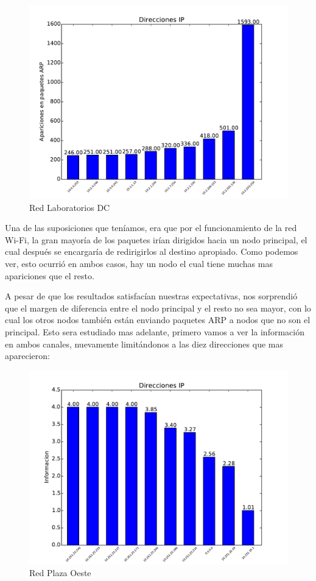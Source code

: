\begin{figure}[ht]
\begin{center}
\includegraphics[width=0.6\columnwidth]{graficos/dc_top_s2.pdf}
\caption{Red Laboratorios DC}
\end{center}
\end{figure}

\pagebreak

Una de las suposiciones que teníamos, era que por el funcionamiento de la red Wi-Fi, la gran mayoría de los paquetes irían dirigidos hacia un nodo principal, el cual después se encargaría de redirigirlos al destino apropiado. Como podemos ver, esto ocurrió en ambos casos, hay un nodo el cual tiene muchas mas apariciones que el resto.

A pesar de que los resultados satisfacían nuestras expectativas, nos sorprendió que el margen de diferencia entre el nodo principal y el resto no sea mayor, con lo cual los otros nodos también están enviando paquetes ARP a nodos que no son el principal. Esto sera estudiado mas adelante, primero vamos a ver la información en ambos canales, nuevamente limitándonos a las diez direcciones que mas aparecieron:

\begin{figure}[ht]
\begin{center}
\includegraphics[width=0.6\columnwidth]{graficos/plaza_top_inf_s2.pdf}
\caption{Red Plaza Oeste}
\end{center}
\end{figure}

